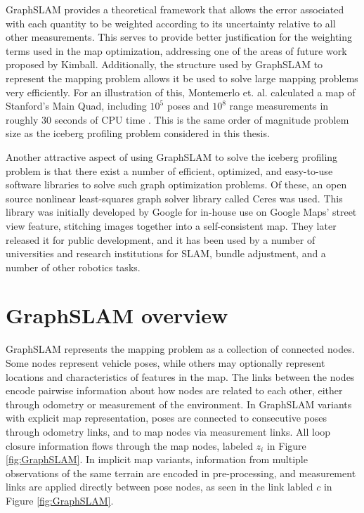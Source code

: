 GraphSLAM provides a theoretical framework that allows the error associated with each quantity to be weighted according to its uncertainty relative to all other measurements. This serves to provide better justification for the weighting terms used in the map optimization, addressing one of the areas of future work proposed by Kimball. Additionally, the structure used by GraphSLAM to represent the mapping problem allows it be used to solve large mapping problems very efficiently. For an illustration of this, Montemerlo et. al. calculated a map of Stanford's Main Quad, including $10^5$ poses and $10^8$ range measurements in roughly 30 seconds of CPU time \cite{?}. This is the same order of magnitude problem size as the iceberg profiling problem considered in this thesis.

Another attractive aspect of using GraphSLAM to solve the iceberg profiling problem is that there exist a number of efficient, optimized, and easy-to-use software libraries to solve such graph optimization problems. Of these, an open source nonlinear least-squares graph solver library called Ceres was used. This library was initially developed by Google for in-house use on Google Maps' street view feature, stitching images together into a self-consistent map. They later released it for public development, and it has been used by a number of universities and research institutions for SLAM, bundle adjustment, and a number of other robotics tasks. \cite{ceres}

\section{GraphSLAM overview}

GraphSLAM represents the mapping problem as a collection of connected nodes. Some nodes represent vehicle poses, while others may optionally represent locations and characteristics of features in the map. The links between the nodes encode pairwise information about how nodes are related to each other, either through odometry or measurement of the environment. In GraphSLAM variants with explicit map representation, poses are connected to consecutive poses through odometry links, and to map nodes via measurement links. All loop closure information flows through the map nodes, labeled $z_i$ in Figure \ref{fig:GraphSLAM}. In implicit map variants, information from multiple observations of the same terrain are encoded in pre-processing, and measurement links are applied directly between pose nodes, as seen in the link labled $c$ in Figure \ref{fig:GraphSLAM}. 


